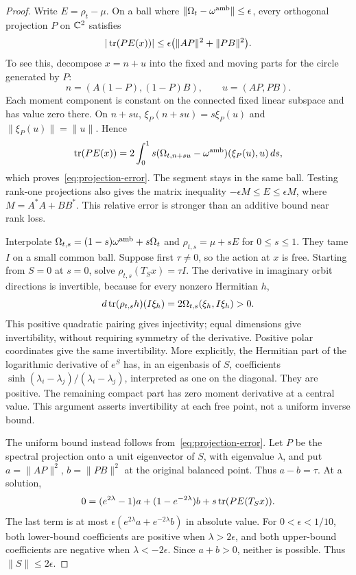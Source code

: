\begin{proof}
Write $E=\rho_t-\mu$. On a ball where
$\|\Omega_t-\omega^{\rm amb}\|\le\epsilon$, every orthogonal
projection $P$ on $\mathbb C^2$ satisfies
\begin{equation}\label{eq:projection-error}
|\operatorname{tr}(PE(x))|\le
\epsilon\bigl(\|AP\|^2+\|PB\|^2\bigr).
\end{equation}
To see this, decompose $x=n+u$ into the fixed and moving parts for
the circle generated by $P$:
\[
n=(A(1-P),(1-P)B),\qquad u=(AP,PB).
\]
Each moment component is constant on the connected fixed linear
subspace and has value zero there. On $n+su$,
$\xi_P(n+su)=s\xi_P(u)$ and $\|\xi_P(u)\|=\|u\|$. Hence
\[
\operatorname{tr}(PE(x))
=2\int_0^1s(\Omega_{t,n+su}-\omega^{\rm amb})
                 (\xi_P(u),u)\,ds,
\]
which proves~\eqref{eq:projection-error}. The segment stays in the
same ball. Testing rank-one projections also gives the matrix inequality
$-\epsilon M\le E\le\epsilon M$, where $M=A^*A+BB^*$.
This relative error is stronger than an additive bound near rank loss.

Interpolate $\Omega_{t,s}=(1-s)\omega^{\rm amb}+s\Omega_t$ and
$\rho_{t,s}=\mu+sE$ for $0\le s\le1$. They tame $I$ on a small
common ball. Suppose first $\tau\ne0$, so the action at $x$ is free.
Starting from $S=0$ at $s=0$, solve
$\rho_{t,s}(T_Sx)=\tau I$. The derivative in imaginary orbit
directions is invertible, because for every nonzero Hermitian $h$,
\[
d\operatorname{tr}(\rho_{t,s}h)(I\xi_h)
=2\Omega_{t,s}(\xi_h,I\xi_h)>0.
\]
This positive quadratic pairing gives injectivity; equal dimensions give
invertibility, without requiring symmetry of the derivative.
Positive polar coordinates give the same invertibility. More explicitly,
the Hermitian part of the logarithmic derivative of $e^S$ has, in an
eigenbasis of $S$, coefficients
$\sinh(\lambda_i-\lambda_j)/(\lambda_i-\lambda_j)$, interpreted as
one on the diagonal. They are positive. The remaining compact part
has zero moment derivative at a central value. This argument asserts
invertibility at each free point, not a uniform inverse bound.

The uniform bound instead follows from~\eqref{eq:projection-error}.
Let $P$ be the spectral projection onto a unit eigenvector of $S$,
with eigenvalue $\lambda$, and put $a=\|AP\|^2$, $b=\|PB\|^2$
at the original balanced point. Thus $a-b=\tau$. At a solution,
\begin{equation}\label{eq:eigen-balance}
0=(e^{2\lambda}-1)a+(1-e^{-2\lambda})b
        +s\operatorname{tr}(PE(T_Sx)).
\end{equation}
The last term is at most
$\epsilon(e^{2\lambda}a+e^{-2\lambda}b)$ in absolute value.
For $0<\epsilon<1/10$, both lower-bound coefficients are positive
when $\lambda>2\epsilon$, and both upper-bound coefficients are
negative when $\lambda<-2\epsilon$. Since $a+b>0$, neither is
possible. Thus $\|S\|\le2\epsilon$.


\end{proof}
